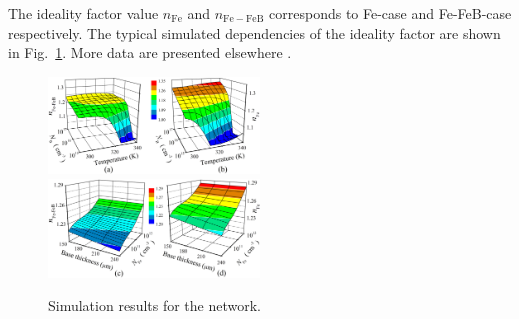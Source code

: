 \documentclass[journal]{IEEEtran}
\begin{document}
The ideality factor value $n_\mathrm{Fe}$ and $n_\mathrm{Fe-FeB}$ corresponds to Fe-case and Fe-FeB-case respectively.
The typical simulated dependencies of  the ideality factor are shown in Fig.~\ref{fig_nValues}.
More data are presented elsewhere \cite{OlikhJPS}.


\begin{figure}[bt]
\centering
\includegraphics[width=0.5\textwidth]{Fig1a}
\includegraphics[width=0.5\textwidth]{Fig1b}
\caption{Simulation results for the network.}
\label{fig_nValues}
\end{figure}




\cite{Keras}
\end{document}
